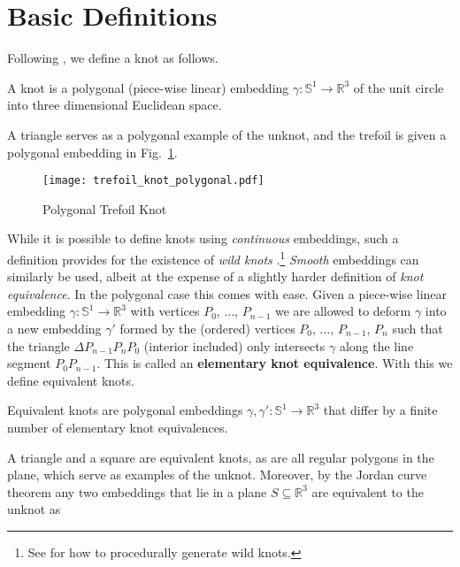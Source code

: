 \section{Basic Definitions}
    Following \cite[p.~15]{LivingstonKnotTheory}, we define a knot as follows.
    \begin{definition}
        A knot is a polygonal (piece-wise linear) embedding
        $\gamma:\mathbb{S}^{1}\rightarrow\mathbb{R}^{3}$ of the unit circle
        into three dimensional Euclidean space.
    \end{definition}
    A triangle serves as a polygonal example of the unknot, and the trefoil is
    given a polygonal embedding in Fig.~\ref{fig:trefoil_knot_polygonal}.
    \begin{figure}
        \centering
        \texttt{[image: trefoil\_knot\_polygonal.pdf]}
        \caption{Polygonal Trefoil Knot}
        \label{fig:trefoil_knot_polygonal}
    \end{figure}
    While it is possible to define knots using \textit{continuous} embeddings,
    such a definition provides for the existence of
    \textit{wild knots} \cite{FoxArtinWildKnots1948}.\footnote{%
        See \cite{BrowneWildKnots} for how to procedurally generate wild knots.
    }
    \textit{Smooth} embeddings can similarly be used, albeit at the expense of
    a slightly harder definition of \textit{knot equivalence}. In the polygonal
    case this comes with ease. Given a piece-wise linear embedding
    $\gamma:\mathbb{S}^{1}\rightarrow\mathbb{R}^{3}$ with vertices
    $P_{0},\,\dots,\,P_{n-1}$ we are allowed to deform $\gamma$ into a new
    embedding $\gamma'$ formed by the (ordered) vertices
    $P_{0},\,\dots,\,P_{n-1},\,P_{n}$
    such that the triangle $\Delta{P}_{n-1}P_{n}P_{0}$ (interior included)
    only intersects $\gamma$
    along the line segment $P_{0}P_{n-1}$. This is called an
    \textbf{elementary knot equivalence}. With this we define equivalent knots.
    \newpage
    \begin{definition}
        Equivalent knots are polygonal embeddings
        $\gamma,\gamma':\mathbb{S}^{1}\rightarrow\mathbb{R}^{3}$ that differ by
        a finite number of elementary knot equivalences.
    \end{definition}
    A triangle and a square are equivalent knots, as are all regular
    polygons in the plane, which serve as examples of the unknot.
    Moreover, by the Jordan curve theorem any two embeddings that
    lie in a plane $S\subseteq\mathbb{R}^{3}$ are equivalent to the unknot as
